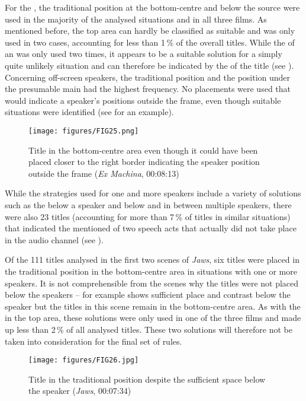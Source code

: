 For the , the traditional position at the bottom-centre and  below the source were used in the majority of the analysed situations and in all three films. As mentioned before, the top area can hardly be classified as suitable and was only used in two cases, accounting for less than 1\,\% of the overall titles. While the  of an  was only used two times, it appears to be a suitable solution for a simply quite unlikely situation and can therefore be indicated by the  of the title (see ). Concerning off-screen speakers, the traditional position and the position under the presumable main  had the highest frequency. No placements were used that would indicate a speaker’s positions outside the frame, even though suitable situations were identified (see  for an example).

\begin{figure}
\texttt{[image: figures/FIG25.png]}
\caption{Title in the bottom-centre area even though it could have been placed closer to the right border indicating the speaker position outside the frame (\textit{Ex Machina}, 00:08:13)}
\label{fig:FIG25}
\end{figure}

While the strategies used for one and more speakers include a variety of solutions such as the  below a speaker and below and in between multiple speakers, there were also 23 titles (accounting for more than 7\,\% of titles in similar situations) that indicated the mentioned  of two speech acts that actually did not take place in the audio channel (see ).
 
\newpage 
Of the 111 titles analysed in the first two scenes of \textit{Jaws}, six titles were placed in the traditional position in the bottom-centre area in situations with one or more speakers. It is not comprehensible from the scenes why the titles were not placed below the speakers –  for example shows sufficient place and contrast below the speaker but the titles in this scene remain in the bottom-centre area. As with the  in the top area, these solutions were only used in one of the three films and made up less than 2\,\% of all analysed titles. These two solutions will therefore not be taken into consideration for the final set of  rules.

\begin{figure}
\texttt{[image: figures/FIG26.jpg]}
\caption{Title in the traditional position despite the sufficient space below the speaker (\textit{Jaws}, 00:07:34)}
\label{fig:FIG26}
\end{figure}

